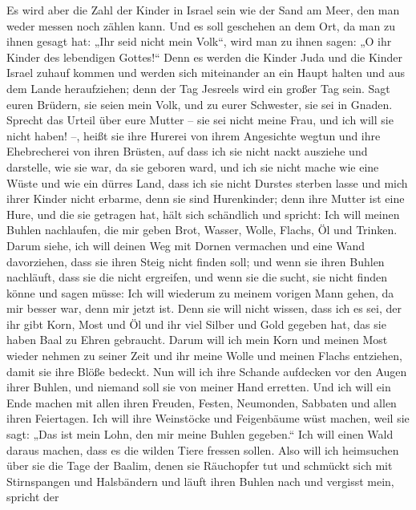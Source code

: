  Es wird aber die Zahl der Kinder in Israel sein wie der
Sand am Meer, den man weder messen noch zählen kann. Und es soll
geschehen an dem Ort, da man zu ihnen gesagt hat: „Ihr seid nicht mein
Volk``, wird man zu ihnen sagen: „O ihr Kinder des lebendigen
Gottes!{}``  Denn es werden die Kinder Juda und die Kinder
Israel zuhauf kommen und werden sich miteinander an ein Haupt halten und
aus dem Lande heraufziehen; denn der Tag Jesreels wird ein großer Tag
sein.  Sagt euren Brüdern, sie seien mein Volk, und zu
eurer Schwester, sie sei in Gnaden.  Sprecht das Urteil
über eure Mutter -- sie sei nicht meine Frau, und ich will sie nicht
haben! --, heißt sie ihre Hurerei von ihrem Angesichte wegtun und ihre
Ehebrecherei von ihren Brüsten,  auf dass ich sie nicht
nackt ausziehe und darstelle, wie sie war, da sie geboren ward, und ich
sie nicht mache wie eine Wüste und wie ein dürres Land, dass ich sie
nicht Durstes sterben lasse  und mich ihrer Kinder nicht
erbarme, denn sie sind Hurenkinder;  denn ihre Mutter ist
eine Hure, und die sie getragen hat, hält sich schändlich und spricht:
Ich will meinen Buhlen nachlaufen, die mir geben Brot, Wasser, Wolle,
Flachs, Öl und Trinken.  Darum siehe, ich will deinen Weg
mit Dornen vermachen und eine Wand davorziehen, dass sie ihren Steig
nicht finden soll;  und wenn sie ihren Buhlen nachläuft,
dass sie die nicht ergreifen, und wenn sie die sucht, sie nicht finden
könne und sagen müsse: Ich will wiederum zu meinem vorigen Mann gehen,
da mir besser war, denn mir jetzt ist.  Denn sie will
nicht wissen, dass ich es sei, der ihr gibt Korn, Most und Öl und ihr
viel Silber und Gold gegeben hat, das sie haben Baal zu Ehren gebraucht.
 Darum will ich mein Korn und meinen Most wieder nehmen
zu seiner Zeit und ihr meine Wolle und meinen Flachs entziehen, damit
sie ihre Blöße bedeckt.  Nun will ich ihre Schande
aufdecken vor den Augen ihrer Buhlen, und niemand soll sie von meiner
Hand erretten.  Und ich will ein Ende machen mit allen
ihren Freuden, Festen, Neumonden, Sabbaten und allen ihren Feiertagen.
 Ich will ihre Weinstöcke und Feigenbäume wüst machen,
weil sie sagt: „Das ist mein Lohn, den mir meine Buhlen gegeben.`` Ich
will einen Wald daraus machen, dass es die wilden Tiere fressen sollen.
 Also will ich heimsuchen über sie die Tage der Baalim,
denen sie Räuchopfer tut und schmückt sich mit Stirnspangen und
Halsbändern und läuft ihren Buhlen nach und vergisst mein, spricht der
